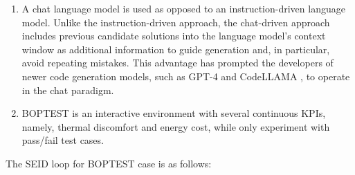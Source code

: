 \begin{enumerate}
  \item A chat language model is used as opposed to an instruction-driven language model. Unlike the instruction-driven approach, the chat-driven approach includes previous candidate solutions into the language model’s context window as additional information to guide generation and, in particular, avoid repeating mistakes. This advantage has prompted the developers of newer code generation models, such as GPT-4 and CodeLLAMA \cite{Code2023}, to operate in the chat paradigm.
  \item BOPTEST is an interactive environment with several continuous KPIs, namely, thermal discomfort and energy cost, while \cite{Reflexion2023,teaching2023,Fully2023} only experiment with pass/fail test cases.
\end{enumerate}
The SEID loop for BOPTEST case is as follows:
